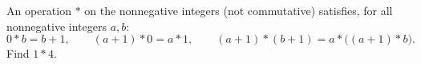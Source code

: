 An operation $*$ on the nonnegative integers (not commutative) satisfies, for all nonnegative integers $a,b$:
\[
0*b=b+1,\qquad (a+1)*0=a*1,\qquad (a+1)*(b+1)=a*\big((a+1)*b\big).
\]
Find $1*4$.
